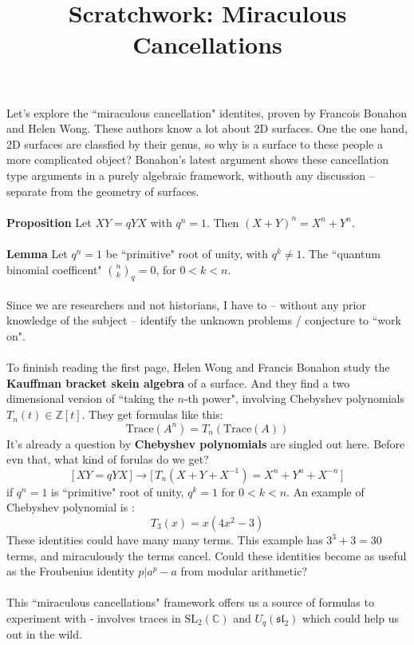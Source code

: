 \documentclass[12pt]{article}
\title{Scratchwork: Miraculous Cancellations}
\date{}
\begin{document}

\sffamily

\maketitle

\noindent Let's explore the ``miraculous cancellation" identites, proven by Francois Bonahon and Helen Wong.  These authors know a lot about 2D surfaces.  One the one hand, 2D surfaces are classfied by their genus, so why is a surface to these people a more complicated object?  Bonahon's latest argument shows these cancellation type arguments in a purely algebraic framework, withouth any discussion -- separate from the geometry of surfaces. \\ \\
\textbf{Proposition} Let $XY = q YX$ with $q^n = 1$.  Then $(X+Y)^n = X^n + Y^n$. \\ \\
\textbf{Lemma} Let $q^n = 1$ be ``primitive" root of unity, with $q^k \neq 1$.  The ``quantum binomial coefficent" $\binom{n}{k}_q =0$, for $0 < k < n$. \\ \\
Since we are researchers and not historians, I have to -- without any prior knowledge of the subject -- identify the unknown problems / conjecture to ``work on".  \\ \\
To fininish reading the first page, Helen Wong and Francis Bonahon study the \textbf{Kauffman bracket skein algebra} of a surface.  And they find a two dimensional version of ``taking the $n$-th power", involving Chebyshev polynomials $T_n(t) \in \mathbb{Z}[t]$. They get formulas like this:
$$ \text{Trace}(A^n) = T_n ( \text{Trace}(A)) $$
It's already a question by \textbf{Chebyshev polynomials}  are singled out here.  Before evn that, what kind of forulas do we get?
$$ \big[\, XY = qYX \, \big] \to  \Big[\,  T_n (X + Y + X^{-1}) = X^n + Y^n + X^{-n} \,\Big] $$
if {\color{green!50!gray} $q^n = 1$} is ``primitive" root of unity, {\color{blue!50!gray} $q^k = 1$} for $0 < k < n$.  An example of Chebyshev polynomial is :
$$  T_3(x) = x ( 4x^2 - 3) $$
These identities could have many many terms.  This example has $3^3 + 3= 30$ terms, and miraculously the terms cancel.  Could these identities become as useful as the Froubenius identity $p \big| a^p - a $ from modular arithmetic? \\ \\
This ``miraculous cancellations" framework offers us a source of formulas to experiment with - involves traces in $\text{SL}_2(\mathbb{C})$ and $U_q(\mathfrak{sl}_2)$ which could help us out in the wild.  
\vfill
\end{document}
